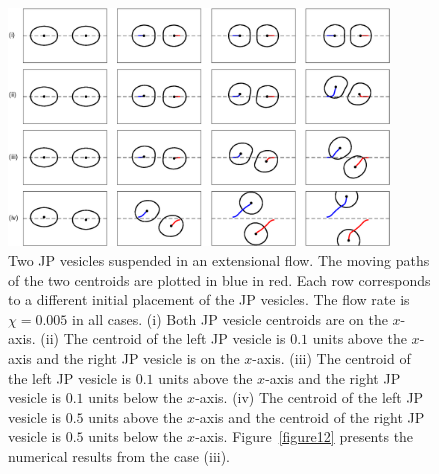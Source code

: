\documentclass[lineno]{jfm}
\begin{document}
\begin{figure}
\begin{center}
\includegraphics[width=0.9\textwidth]{ExtTraj.eps}
\end{center} 
  \caption{\label{figure11} Two JP vesicles suspended in
  an extensional flow. The moving paths of the two centroids are plotted
  in blue in red. Each row corresponds to a different initial placement
  of the JP vesicles. The flow rate is $\chi = 0.005$ in all cases.
  (i) Both JP vesicle centroids are on the $x$-axis. (ii) The
  centroid of the left JP vesicle is $0.1$ units above the $x$-axis
  and the right JP vesicle is on the $x$-axis. (iii) The centroid of
  the left JP vesicle is $0.1$ units above the $x$-axis and the right
  JP vesicle is $0.1$ units below the $x$-axis. (iv) The centroid of
  the left JP vesicle is $0.5$ units above the $x$-axis and the
  centroid of the right JP vesicle is $0.5$ units below the $x$-axis.
  Figure~\ref{figure12} presents the numerical results from the case
  (iii).}
\end{figure}
\end{document}
